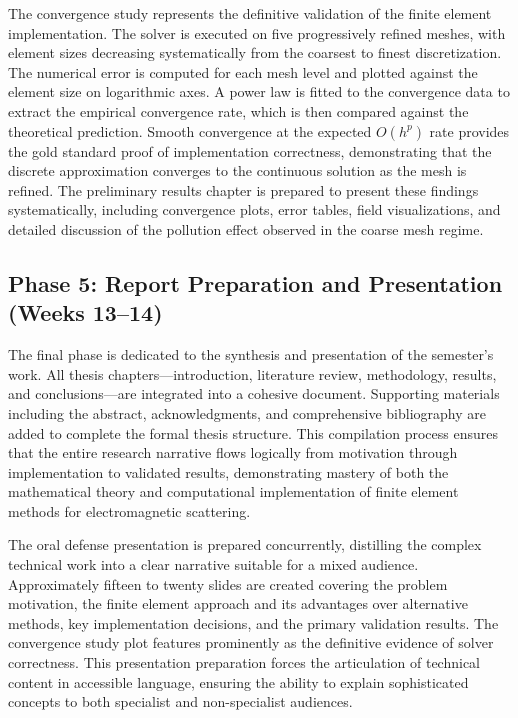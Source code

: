 \documentclass[class=report, crop=false]{standalone}
\begin{document}
The convergence study represents the definitive validation of the finite element implementation. The solver is executed on five progressively refined meshes, with element sizes decreasing systematically from the coarsest to finest discretization. The numerical error is computed for each mesh level and plotted against the element size on logarithmic axes. A power law is fitted to the convergence data to extract the empirical convergence rate, which is then compared against the theoretical prediction. Smooth convergence at the expected $O(h^p)$ rate provides the gold standard proof of implementation correctness, demonstrating that the discrete approximation converges to the continuous solution as the mesh is refined. The preliminary results chapter is prepared to present these findings systematically, including convergence plots, error tables, field visualizations, and detailed discussion of the pollution effect observed in the coarse mesh regime.

\subsection{Phase 5: Report Preparation and Presentation (Weeks 13--14)}

The final phase is dedicated to the synthesis and presentation of the semester's work. All thesis chapters—introduction, literature review, methodology, results, and conclusions—are integrated into a cohesive document. Supporting materials including the abstract, acknowledgments, and comprehensive bibliography are added to complete the formal thesis structure. This compilation process ensures that the entire research narrative flows logically from motivation through implementation to validated results, demonstrating mastery of both the mathematical theory and computational implementation of finite element methods for electromagnetic scattering.

The oral defense presentation is prepared concurrently, distilling the complex technical work into a clear narrative suitable for a mixed audience. Approximately fifteen to twenty slides are created covering the problem motivation, the finite element approach and its advantages over alternative methods, key implementation decisions, and the primary validation results. The convergence study plot features prominently as the definitive evidence of solver correctness. This presentation preparation forces the articulation of technical content in accessible language, ensuring the ability to explain sophisticated concepts to both specialist and non-specialist audiences.
\end{document}
